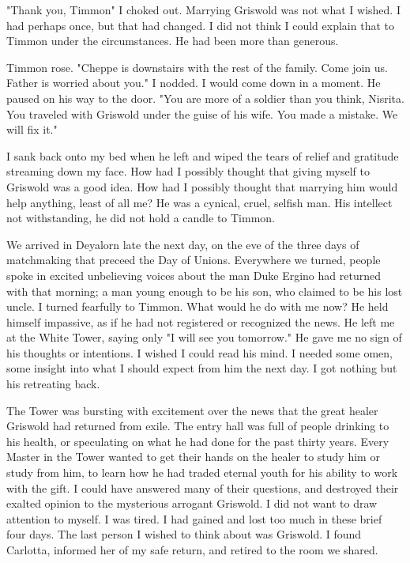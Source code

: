 \documentclass{article}
\begin{document}
"Thank you, Timmon" I choked out. Marrying Griswold was not what I wished. I had perhaps once, but that had changed. I did not think I could explain that to Timmon under the circumstances. He had been more than generous.

Timmon rose. "Cheppe is downstairs with the rest of the family. Come join us. Father is worried about you." I nodded. I would come down in a moment. He paused on his way to the door. "You are more of a soldier than you think, Nisrita. You traveled with Griswold under the guise of his wife. You made a mistake. We will fix it."

I sank back onto my bed when he left and wiped the tears of relief and gratitude streaming down my face. How had I possibly thought that giving myself to Griswold was a good idea. How had I possibly thought that marrying him would help anything, least of all me? He was a cynical, cruel, selfish man. His intellect not withstanding, he did not hold a candle to Timmon.

\vspace{.5cm}

We arrived in Deyalorn late the next day, on the eve of the three days of matchmaking that preceed the Day of Unions. Everywhere we turned, people spoke in excited unbelieving voices about the man Duke Ergino had returned with that morning; a man young enough to be his son, who claimed to be his lost uncle. I turned fearfully to Timmon. What would he do with me now? He held himself impassive, as if he had not registered or recognized the news. He left me at the White Tower, saying only "I will see you tomorrow." He gave me no sign of his thoughts or intentions. I wished I could read his mind. I needed some omen, some insight into what I should expect from him the next day. I got nothing but his retreating back.

The Tower was bursting with excitement over the news that the great healer Griswold had returned from exile. The entry hall was full of people drinking to his health, or speculating on what he had done for the past thirty years. Every Master in the Tower wanted to get their hands on the healer to study him or study from him, to learn how he had traded eternal youth for his ability to work with the gift. I could have answered many of their questions, and destroyed their exalted opinion to the mysterious arrogant Griswold. I did not want to draw attention to myself. I was tired. I had gained and lost too much in these brief four days. The last person I wished to think about was Griswold. I found Carlotta, informed her of my safe return, and retired to the room we shared. 
\end{document}
